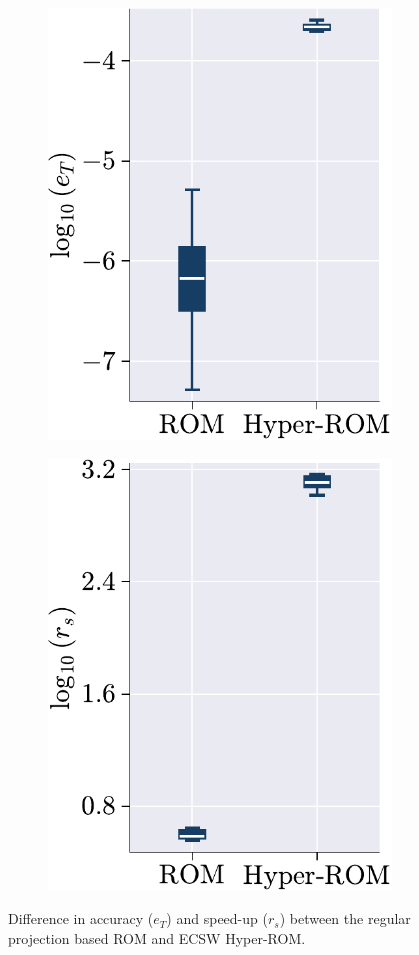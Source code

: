 \documentclass[11pt]{article}
\begin{document}
\begin{figure}[t]
\centering
\begin{subfigure}[b]{0.47\linewidth}
\centering
\includegraphics[height=0.95\linewidth]{error_comp_rom_hrom_ecsw.pdf}
\caption{}
\label{fig:HROM_ERROR_SPDUP_a}
\end{subfigure}\hfill
\begin{subfigure}[b]{0.47\linewidth}
\centering
\includegraphics[height=0.95\linewidth]{speed_up_comp_rom_hrom_ecsw.pdf}
\caption{}
\label{fig:HROM_ERROR_SPDUP_b}
\end{subfigure}
\caption{Difference in accuracy ($e_T$) and speed-up ($r_s$) between the regular projection based ROM and ECSW Hyper-ROM.}
\label{fig:HROM_ERROR_SPDUP}
\end{figure}
\end{document}
